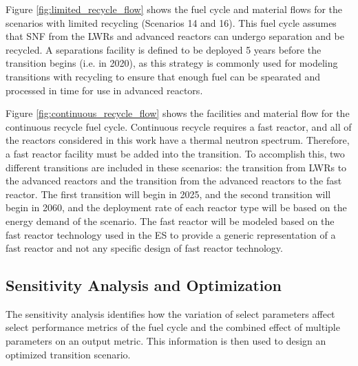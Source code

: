 Figure \ref{fig:limited_recycle_flow} shows the fuel cycle and material flows 
for the scenarios with limited recycling (Scenarios 14 and 16). This fuel 
cycle assumes that \gls{SNF}
from the \glspl{LWR} and advanced reactors can undergo separation and be 
recycled. A separations facility is defined to be deployed 5 years before 
the transition 
begins (i.e. in 2020), as this strategy is commonly used for modeling 
transitions with recycling \cite{passerini_systematic_2014,richards_application_2021}
to ensure that enough fuel can be spearated and 
processed in time for use in advanced reactors.



Figure \ref{fig:continuous_recycle_flow} shows the facilities and material 
flow for the continuous recycle fuel cycle. Continuous recycle 
requires a fast reactor, and all of the reactors considered in this 
work have a thermal neutron spectrum. Therefore, a fast reactor facility 
must be added into the transition. To accomplish this, two different 
transitions are included in these scenarios: the transition from 
\glspl{LWR} to the advanced reactors and the transition from the 
advanced reactors to the fast reactor. The first transition will begin 
in 2025, and the second transition will begin in 2060, and the deployment 
rate of each reactor type will be based on the energy demand of the 
scenario. 
The fast reactor will be modeled 
based on the fast reactor technology used in the \gls{ES} 
\cite{wigeland_nuclear_2014} to provide a generic representation of 
a fast reactor and not any specific design of fast reactor technology. 




\subsection{Sensitivity Analysis and Optimization}
The sensitivity analysis identifies how the variation of select
parameters affect select performance 
metrics of the fuel cycle and the combined effect of multiple parameters on 
an output metric. This information is then used to design 
an optimized transition scenario. 

